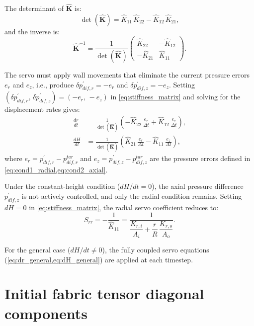 \documentclass[a4paper,fleqn]{cas-sc}
\begin{document}
The determinant of $\hat{\mathbf{K}}$ is:
\begin{equation}
\det(\hat{\mathbf{K}}) = \hat{K}_{11}\,\hat{K}_{22} - \hat{K}_{12}\,\hat{K}_{21},
\label{eq:det_K}
\end{equation}
and the inverse is:
\begin{equation}
\hat{\mathbf{K}}^{-1}
=
\frac{1}{\det(\hat{\mathbf{K}})}
\begin{pmatrix} \hat{K}_{22} & -\hat{K}_{12} \\[6pt] -\hat{K}_{21} & \hat{K}_{11} \end{pmatrix}.
\label{eq:stiffness_matrix_inv}
\end{equation}

The servo must apply wall movements that eliminate the current pressure errors $e_r$ and $e_z$, i.e., produce $\delta p_{dif,r}^{\prime}=-e_r$ and $\delta p_{dif,z}^{\prime}=-e_z$. Setting $(\delta p_{dif,r}^{\prime},\,\delta p_{dif,z}^{\prime})=(-e_r,\,-e_z)$ in \cref{eq:stiffness_matrix} and solving for the displacement rates gives:
\begin{align}
\frac{dr}{dt} &= \frac{1}{\det(\hat{\mathbf{K}})}\!\left(-\hat{K}_{22}\,\frac{e_r}{\Delta t} + \hat{K}_{12}\,\frac{e_z}{\Delta t}\right), \label{eq:dr_general}\\[6pt]
\frac{dH}{dt} &= \frac{1}{\det(\hat{\mathbf{K}})}\!\left(\hat{K}_{21}\,\frac{e_r}{\Delta t} - \hat{K}_{11}\,\frac{e_z}{\Delta t}\right), \label{eq:dH_general}
\end{align}
where $e_r=p_{dif,r}^{\prime}-p_{dif,r}^{tar}$ and $e_z=p_{dif,z}^{\prime}-p_{dif,z}^{tar}$ are the pressure errors defined in \cref{eq:cond1_radial,eq:cond2_axial}.

Under the constant-height condition ($dH/dt=0$), the axial pressure difference $p_{dif,z}^{\prime}$ is not actively controlled, and only the radial condition remains. Setting $dH=0$ in \cref{eq:stiffness_matrix}, the radial servo coefficient reduces to:
\begin{equation}
S_{rr} = -\frac{1}{\hat{K}_{11}} = \frac{1}{\dfrac{K_{r,i}}{A_i}+\dfrac{r}{R}\,\dfrac{K_{r,o}}{A_o}}.
\label{eq:Srr_constantH}
\end{equation}

For the general case ($dH/dt\neq 0$), the fully coupled servo equations (\cref{eq:dr_general,eq:dH_general}) are applied at each timestep.
 \section{Initial fabric tensor diagonal components}
\label{sec:appendix_fabric}
\end{document}
